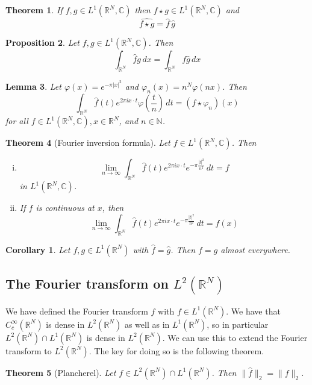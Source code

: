 \documentclass[10pt, oneside, reqno]{amsart}
\theoremstyle{plain}%
\newtheorem{thm}{Theorem}[section]
\newtheorem{lem}[thm]{Lemma}
\newtheorem{prop}[thm]{Proposition}
\newtheorem*{cor}{Corollary}
\theoremstyle{definition}
\theoremstyle{remark}
\newcommand{\R}{\mathbb{R}}
\newcommand{\Com}{\mathbb{C}}
\renewcommand{\phi}{\varphi}
\begin{document}
\begin{thm}
    If $f,g \in L^1(\R^N, \Com)$ then $f \star g \in L^1(\R^N, \Com)$ and \[
        \hat{f \star g} = \hat f \, \hat g
    \]
\end{thm}
\begin{prop}
    Let $f,g \in L^1(\R^N, \Com)$.  Then \[
        \int_{\R^N} \hat f g \, dx = \int_{\R^N} f \hat g \, dx
    \]
\end{prop}

\begin{lem}
    Let $\phi(x) = e^{- \pi |x|^2}$ and $\phi_n(x) = n^N \phi(n x)$.  Then \[
        \int_{\R^N} \hat f (t) e^{2 \pi i x \cdot t} \phi\left(\frac{t}{n} \right) \, dt = (f \star \phi_n) (x)
    \]
    for all $f \in L^1(\R^N,\Com), x \in \R^N$, and $n \in \mathbb{N}$.
\end{lem}

\begin{thm}[Fourier inversion formula]
    Let $f \in L^1(\R^N, \Com)$. Then 
    \begin{enumerate}[(i)]
        \item \[
            \lim_{n \rightarrow \infty} \int_{\R^N} \hat f (t) e^{2 \pi i x \cdot t} e^{- \pi \frac{|t|^2}{n^2}} \, dt = f
        \] in $L^1(\R^N, \Com)$.
        \item If $f$ is continuous at $x$, then \[
            \lim_{n \rightarrow \infty} \int_{\R^N} \hat f (t) e^{2 \pi i x \cdot t} e^{- \pi \frac{|t|^2}{n^2}} \, dt = f(x)
        \]
    \end{enumerate}
\end{thm}

\begin{cor}
    Let $f,g \in L^1(\R^N)$ with $\hat f = \hat g$. Then $f = g$ almost everywhere. 
\end{cor}

\subsection{The Fourier transform on $L^2(\R^N)$} %
\label{sub:the_fourier_transform_on_l_2_r_n_}
    We have defined the Fourier transform $\hat f$ with $f \in L^1(\R^N)$.  We  have that $C_c^\infty(\R^N)$ is dense in $L^2(\R^N)$ as well as in $L^1(\R^N)$, so in particular $L^2(\R^N) \cap L^1(\R^N)$ is dense in $L^2(\R^N)$. We can use this to extend the Fourier transform to $L^2(\R^N)$.  The key for doing so is the following theorem.  
    \begin{thm}[Plancherel]
        Let $f \in L^2(\R^N) \cap L^1(\R^N)$. Then $\| \hat f \|_2 = \| f \|_2$. 
    \end{thm}
\end{document}
